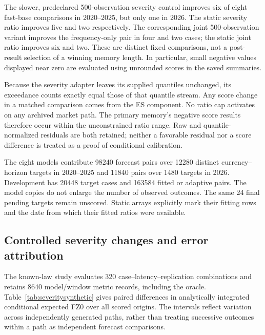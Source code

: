 \documentclass[11pt,a4paper]{article}
\theoremstyle{definition}\newtheorem{definition}[theorem]{Definition}
\begin{document}
The slower, predeclared 500-observation severity control improves six of eight fast-base comparisons in 2020--2025, but only one in 2026. The static severity ratio improves five and two respectively. The corresponding joint 500-observation variant improves the frequency-only pair in four and two cases; the static joint ratio improves six and two. These are distinct fixed comparisons, not a post-result selection of a winning memory length. In particular, small negative values displayed near zero are evaluated using unrounded scores in the saved summaries.

\begin{table}[htbp]\centering\small
\caption{Retrospective mean FZ0 differences with unchanged quantiles. $S_d$ changes only severity relative to the fast base; $J_d$ changes severity relative to the frequency-only pair. Subscript $d$ is the feedback half-life and ``fix'' denotes the development-fitted constant ratio. Negative differences favor the severity variant. All eight models remain in the saved results.}\label{tab:severitymarket}

\end{table}

{
Because the severity adapter leaves its supplied quantiles unchanged, its exceedance counts exactly equal those of that quantile stream. Any score change in a matched comparison comes from the ES component. No ratio cap activates on any archived market path. The primary memory's negative score results therefore occur within the unconstrained ratio range. Raw and quantile-normalized residuals are both retained; neither a favorable residual nor a score difference is treated as a proof of conditional calibration.\par}

The eight models contribute 98240 forecast pairs over 12280 distinct currency--horizon targets in 2020--2025 and 11840 pairs over 1480 targets in 2026. Development has 20448 target cases and 163584 fitted or adaptive pairs. The model copies do not enlarge the number of observed outcomes. The same 24 final pending targets remain unscored. Static arrays explicitly mark their fitting rows and the date from which their fitted ratios were available.

\subsection{Controlled severity changes and error attribution}\label{sec:severitysyntheticresults}
The known-law study evaluates 320 case--latency--replication combinations and retains 8640 model/window metric records, including the oracle. Table~\ref{tab:severitysynthetic} gives paired differences in analytically integrated conditional expected FZ0 over all scored origins. The intervals reflect variation across independently generated paths, rather than treating successive outcomes within a path as independent forecast comparisons.
\end{document}
